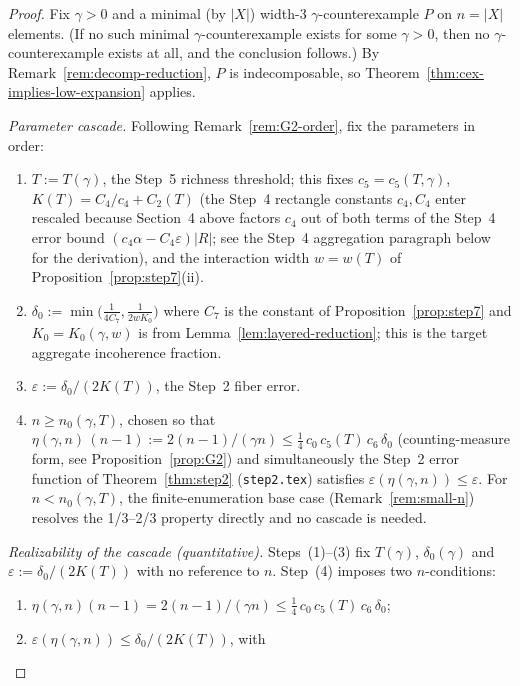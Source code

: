 \begin{proof}
Fix $\gamma > 0$ and a minimal (by $|X|$) width-$3$
$\gamma$-counter\-example $P$ on $n = |X|$ elements. (If no such minimal
$\gamma$-counter\-example exists for some $\gamma > 0$, then no
$\gamma$-counter\-example exists at all, and the conclusion follows.)
By Remark~\ref{rem:decomp-reduction}, $P$ is indecomposable, so
Theorem~\ref{thm:cex-implies-low-expansion} applies.

\medskip\noindent\emph{Parameter cascade.} Following
Remark~\ref{rem:G2-order}, fix the parameters in order:
\begin{enumerate}[nosep, label=(\arabic*)]
 \item $T := T(\gamma)$, the Step~5 richness threshold; this fixes
 $c_5 = c_5(T,\gamma)$, $K(T) = C_4/c_4 + C_2(T)$ (the Step~4
 rectangle constants $c_4, C_4$ enter rescaled because Section~4
 above factors $c_4$ out of both terms of the Step~4 error bound
 $(c_4\alpha - C_4\varepsilon)|R|$; see the Step~4 aggregation
 paragraph below for the derivation), and the interaction width
 $w = w(T)$ of Proposition~\ref{prop:step7}(ii).
 \item $\delta_0 := \min\!\big(\tfrac{1}{4 C_7}, \tfrac{1}{2 w K_0}\big)$
 where $C_7$ is the constant of Proposition~\ref{prop:step7} and
 $K_0 = K_0(\gamma, w)$ is from Lemma~\ref{lem:layered-reduction};
 this is the target aggregate incoherence fraction.
 \item $\varepsilon := \delta_0 / (2 K(T))$, the Step~2 fiber error.
 \item $n \ge n_0(\gamma, T)$, chosen so that
 $\eta(\gamma, n)\,(n-1) := 2(n-1)/(\gamma n) \le \tfrac{1}{4}\, c_0\,
 c_5(T)\, c_6\,\delta_0$ (counting-measure form, see
 Proposition~\ref{prop:G2}) and simultaneously the Step~2 error
 function of Theorem~\ref{thm:step2} (\texttt{step2.tex}) satisfies
 $\varepsilon(\eta(\gamma, n)) \le \varepsilon$. For $n < n_0(\gamma,
 T)$, the finite-enumeration base case
 (Remark~\ref{rem:small-n}) resolves the 1/3--2/3 property directly
 and no cascade is needed.
\end{enumerate}
\smallskip\noindent\emph{Realizability of the cascade (quantitative).}
Steps~(1)--(3) fix $T(\gamma)$, $\delta_0(\gamma)$ and $\varepsilon
:= \delta_0/(2K(T))$ with no reference to $n$. Step~(4) imposes two
$n$-conditions:
\begin{enumerate}[nosep, label=\textup{(\alph*)}]
 \item $\eta(\gamma,n)(n-1) = 2(n-1)/(\gamma n) \le
  \tfrac14\, c_0\, c_5(T)\, c_6\, \delta_0$;
 \item $\varepsilon(\eta(\gamma,n)) \le \delta_0/(2 K(T))$, with

\end{enumerate}
\end{proof}
